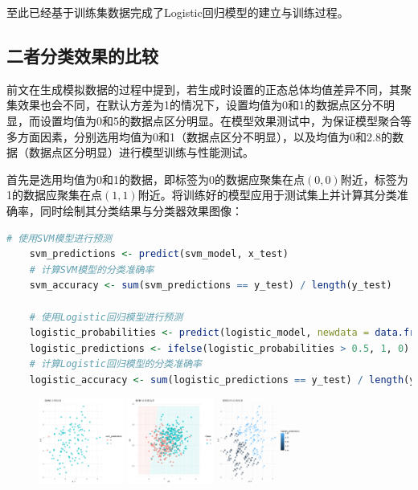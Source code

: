 \documentclass[12pt]{article}  %
\begin{document}
至此已经基于训练集数据完成了Logistic回归模型的建立与训练过程。

\subsection{二者分类效果的比较}

前文在生成模拟数据的过程中提到，若生成时设置的正态总体均值差异不同，其聚集效果也会不同，在默认方差为1的情况下，设置均值为0和1的数据点区分不明显，而设置均值为0和5的数据点区分明显。在模型效果测试中，为保证模型聚合等多方面因素，分别选用均值为0和1（数据点区分不明显），以及均值为0和2.8的数据（数据点区分明显）进行模型训练与性能测试。

首先是选用均值为0和1的数据，即标签为0的数据应聚集在点$(0,0)$附近，标签为1的数据应聚集在点$(1,1)$附近。将训练好的模型应用于测试集上并计算其分类准确率，同时绘制其分类结果与分类器效果图像：

\begin{lstlisting}[language=R]
	# 使用SVM模型进行预测
	svm_predictions <- predict(svm_model, x_test)
	# 计算SVM模型的分类准确率
	svm_accuracy <- sum(svm_predictions == y_test) / length(y_test)
	
	# 使用Logistic回归模型进行预测
	logistic_probabilities <- predict(logistic_model, newdata = data.frame(x = x_test), type = "response")
	logistic_predictions <- ifelse(logistic_probabilities > 0.5, 1, 0)
	# 计算Logistic回归模型的分类准确率
	logistic_accuracy <- sum(logistic_predictions == y_test) / length(y_test)
\end{lstlisting}

\begin{figure}[H]
	\centering
	\includegraphics[width=0.25\textwidth]{5.png}
	\includegraphics[width=0.25\textwidth]{6.png}
	\includegraphics[width=0.25\textwidth]{7.png}
\end{figure}
\end{document}
